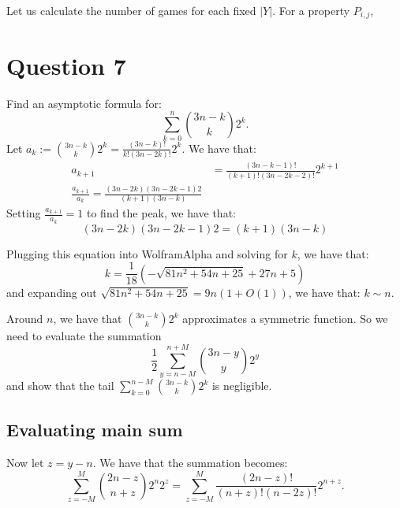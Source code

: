 \documentclass[]{article}
\theoremstyle{definition}
\numberwithin{theorem}{section}
\numberwithin{equation}{section}
\begin{document}
Let us calculate the number of games for each fixed $|Y|$. For a property $P_{i, j}$, 

\section{Question 7}
Find an asymptotic formula for:
\begin{equation}
	\sum_{k = 0}^n \binom{3n - k}{k} 2^k.
\end{equation}
Let $a_k := \binom{3n - k}{k} 2^k = \frac{(3n - k)!}{k! (3n - 2k)!} 2^k$.
We have that:
\begin{align*}
	a_{k + 1} &= \frac{(3n - k - 1)!}{(k + 1)! (3n - 2k - 2)!} 2^{k + 1}\\
	\frac{a_{k + 1}}{a_k} = \frac{(3n - 2k)(3n - 2k - 1) 2}{(k + 1)(3n - k)}
\end{align*}
Setting $\frac{a_{k + 1}}{a_k} = 1$ to find the peak, we have that:
\begin{equation}
	(3n - 2k)(3n - 2k - 1) 2 = (k + 1)(3n - k)
\end{equation}

Plugging this equation into WolframAlpha and solving for $k$, we have that:
\begin{equation}
	k = \frac{1}{18}\left(- \sqrt{81 n^2 + 54 n + 25} + 27 n + 5\right)
\end{equation}
and expanding out $\sqrt{81 n^2 + 54 n + 25} = 9 n(1 + O(1))$, we have that:
$k \sim n$. 

Around $n$, we have that $\binom{3n - k}{k} 2^k$ approximates a symmetric function. So we need to evaluate the summation
\begin{equation}
	\frac{1}{2}\sum_{y = n - M}^{n + M} \binom{3n - y}{y} 2^y
\end{equation}
and show that the tail $\sum_{k = 0}^{n - M} \binom{3n - k}{k} 2^k$ is negligible.

\subsection{Evaluating main sum}
Now let $z = y - n$. We have that the summation becomes:
\begin{equation}
	\sum_{z = -M}^M \binom{2n - z}{n + z} 2^n 2^z = \sum_{z = -M}^M\frac{(2n - z)!}{(n + z)! (n - 2z)!} 2^{n + z}. 
\end{equation}
\end{document}
